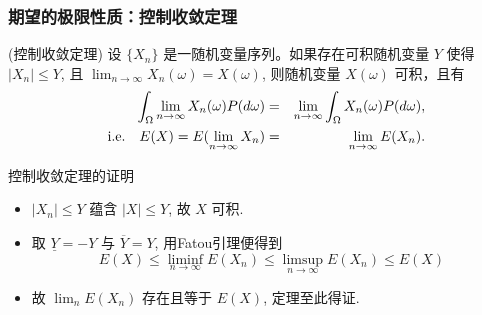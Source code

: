 	\begin{frame}
		\frametitle{期望的极限性质：控制收敛定理}
		\begin{thm}
			(控制收敛定理) 设 $\{X_n\}$ 是一随机变量序列。如果存在可积随机变量 $Y$ 使得 $|X_n|\leq Y$, 且 $\lim_{n\rightarrow\infty} X_n (\omega)=X (\omega)$, 则随机变量 $X (\omega)$ 可积，且有
			\begin{eqnarray*}
				\int_{\Omega}\lim_{n\rightarrow\infty}X_n(\omega)P(d\omega)&=& \lim_{n\rightarrow\infty}\int_\Omega X_n(\omega)P(d\omega),\\
				\quad{\rm i.e.} \quad    E(X)=E(\lim_{n\rightarrow\infty}X_n)&=&\lim_{n\rightarrow\infty}E(X_n).
			\end{eqnarray*}

		\end{thm}

	\end{frame}
	\begin{frame}{控制收敛定理的证明}
		\begin{itemize}[<+-|alert@+>]
			\item  $\left|X_{n}\right| \leq Y$ 蕴含 $|X| \leq Y$, 故 $X$ 可积.
			\item 取 $\underline{Y}=-Y$ 与 $\overline{Y}=Y$, 用Fatou引理便得到
			\[
			E(X) \leq \liminf_{n\rightarrow\infty} E\left(X_{n}\right) \leq \limsup_{n\rightarrow\infty} E\left(X_{n}\right) \leq E(X)
			\]
			\item 故 $\lim _{n} E\left(X_{n}\right)$ 存在且等于 $E(X)$, 定理至此得证.
		\end{itemize}


	\end{frame}


